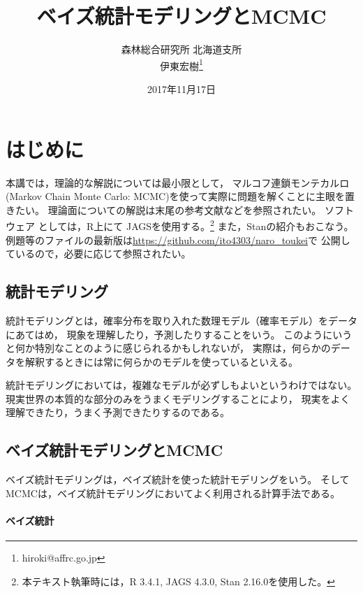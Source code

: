 \documentclass[11pt,uplatex]{jsarticle}
\begin{document}
\title{ベイズ統計モデリングとMCMC}
\author{森林総合研究所 北海道支所\\伊東宏樹\footnote{hiroki@affrc.go.jp}}
\date{2017年11月17日}
\maketitle


\section{はじめに}

本講では，理論的な解説については最小限として，
マルコフ連鎖モンテカルロ(Markov Chain Monte Carlo: MCMC)を使って実際に問題を解くことに主眼を置きたい。
理論面についての解説は末尾の参考文献などを参照されたい。
ソフトウェア
としては，\textsf{R}\cite{R}上にて
\textsf{JAGS}\cite{JAGS}を使用する。\footnote{本テキスト執筆時には，R 3.4.1, JAGS 4.3.0, Stan 2.16.0を使用した。}
また，\textsf{Stan}\cite{Stan}の紹介もおこなう。
例題等のファイルの最新版は\url{https://github.com/ito4303/naro_toukei}で
公開しているので，必要に応じて参照されたい。

\subsection{統計モデリング}

統計モデリングとは，確率分布を取り入れた数理モデル（確率モデル）をデータにあてはめ，
現象を理解したり，予測したりすることをいう\cite{Matsuura}。
このようにいうと何か特別なことのように感じられるかもしれないが，
実際は，何らかのデータを解釈するときには常に何らかのモデルを使っているといえる\cite{BPA}。

統計モデリングにおいては，複雑なモデルが必ずしもよいというわけではない。
現実世界の本質的な部分のみをうまくモデリングすることにより，
現実をよく理解できたり，うまく予測できたりするのである\cite{BPA}。

\subsection{ベイズ統計モデリングとMCMC}

ベイズ統計モデリングは，ベイズ統計を使った統計モデリングをいう。
そしてMCMCは，ベイズ統計モデリングにおいてよく利用される計算手法である。

\paragraph{ベイズ統計}
\end{document}
